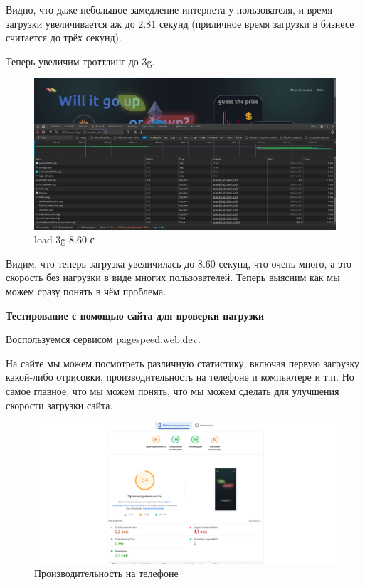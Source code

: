 \documentclass[a4paper, 12pt]{article}
\begin{document}
Видно, что даже небольшое замедление интернета у пользователя, и время загрузки увеличивается аж до 2.81 секунд (приличное время загрузки в бизнесе считается до трёх секунд).

Теперь увеличим троттлинг до 3g.

\newpage
\begin{figure}[h!]
    \noindent
    \centering
    \includegraphics[width=1\linewidth]{pic_load_f12_3.png}
    \caption{load 3g 8.60 с}
\end{figure}

Видим, что теперь загрузка увеличилась до 8.60 секунд, что очень много, а это скорость без нагрузки в виде многих пользователей. Теперь выясним как мы можем сразу понять в чём проблема.

\textbf{Тестирование с помощью сайта для проверки нагрузки}

Воспользуемся сервисом \href{https://pagespeed.web.dev/?hl=ru}{pagespeed.web.dev}.

На сайте мы можем посмотреть различную статистику, включая первую загрузку какой-либо отрисовки, производительность на телефоне и компьютере и т.п. Но самое главное, что мы можем понять, что мы можем сделать для улучшения скорости загрузки сайта.

\begin{figure}[h!]
    \noindent
    \centering
    \includegraphics[width=1\linewidth]{pic_web_1.png}
    \caption{Производительность на телефоне}
\end{figure}
\end{document}
